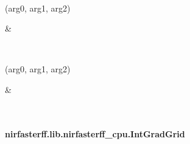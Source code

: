 \documentclass[letterpaper,10pt,english]{sphinxmanual}
\begin{document}
\begin{savenotes}
\begin{longtable}{}
\begin{varwidth}[t]{}
\sphinxbeforeendvarwidth
\end{varwidth}%
\\
\sphinxhline\begin{varwidth}[t]{}
\sphinxAtStartPar
{\hyperref[\detokenize{_autosummary/nirfasterff.lib.nirfasterff_cpu.mesh_support:nirfasterff.lib.nirfasterff_cpu.mesh_support}]{}}(arg0, arg1, arg2)
\sphinxbeforeendvarwidth
\end{varwidth}%
&\begin{varwidth}[t]{}
\sphinxAtStartPar

\sphinxbeforeendvarwidth
\end{varwidth}%
\\
\sphinxhline\begin{varwidth}[t]{}
\sphinxAtStartPar
{\hyperref[\detokenize{_autosummary/nirfasterff.lib.nirfasterff_cpu.pointLocation:nirfasterff.lib.nirfasterff_cpu.pointLocation}]{}}(arg0, arg1, arg2)
\sphinxbeforeendvarwidth
\end{varwidth}%
&\begin{varwidth}[t]{}
\sphinxAtStartPar

\sphinxbeforeendvarwidth
\end{varwidth}%
\\
\sphinxbottomrule
\end{longtable}
\sphinxtableafterendhook
\sphinxatlongtableend
\end{savenotes}

\sphinxstepscope


\paragraph{nirfasterff.lib.nirfasterff\_cpu.IntGradGrid}
\label{\detokenize{_autosummary/nirfasterff.lib.nirfasterff_cpu.IntGradGrid:nirfasterff-lib-nirfasterff-cpu-intgradgrid}}\label{\detokenize{_autosummary/nirfasterff.lib.nirfasterff_cpu.IntGradGrid::doc}}
\end{document}
